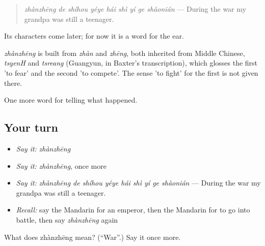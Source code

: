 \begin{quote}
\emph{zhànzhēng de shíhou yéye hái shì yí ge shàonián} — During the war my grandpa was still a teenager.
\end{quote}

Its characters come later; for now it is a word for the ear.

\begin{cousinweb}
\emph{zhànzhēng} is built from \emph{zhàn} and \emph{zhēng}, both inherited from Middle Chinese, \emph{tsyenH} and \emph{tsreang} (Guangyun, in Baxter's transcription), which glosses the first 'to fear' and the second 'to compete'. The sense 'to fight' for the first is not given there.
\end{cousinweb}

\begin{grammarlens}[title={What you've built}]
One more word for telling what happened.
\end{grammarlens}

\subsection*{Your turn}
\begin{itemize}
\raggedright
  \item \emph{Say it:} \emph{zhànzhēng}
  \item \emph{Say it:} \emph{zhànzhēng}, once more
  \item \emph{Say it:} \emph{zhànzhēng de shíhou yéye hái shì yí ge shàonián} — During the war my grandpa was still a teenager.
  \item \emph{Recall:} say the Mandarin for an emperor, then the Mandarin for to go into battle, then say \emph{zhànzhēng} again
\end{itemize}

\begin{tcolorbox}[breakable,colback=teal!4,colframe=teal!35!black,title={Before you move on}]
What does zhànzhēng mean? (\textquotedblleft{}War\textquotedblright{}.) Say it once more.
\end{tcolorbox}
